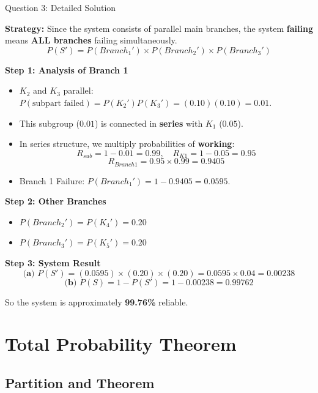 \documentclass[light]{lutbeamer}
\begin{document}
\begin{frame}[allowframebreaks]{Question 3: Detailed Solution}
    \small
    {\color{red}
    \textbf{Strategy:} Since the system consists of parallel main branches, the system \textbf{failing} means \textbf{ALL branches} failing simultaneously.
    \[ P(S') = P(Branch_1') \times P(Branch_2') \times P(Branch_3') \]

    \textbf{Step 1: Analysis of Branch 1}
    \begin{itemize}
        \item $K_2$ and $K_3$ parallel: $P(\text{subpart failed}) = P(K_2')P(K_3') = (0.10)(0.10) = 0.01$.
        \item This subgroup ($0.01$) is connected in \textbf{series} with $K_1$ ($0.05$).
        \item In series structure, we multiply probabilities of \textbf{working}:
        \[ R_{sub} = 1 - 0.01 = 0.99, \quad R_{K1} = 1 - 0.05 = 0.95 \]
        \[ R_{Branch1} = 0.95 \times 0.99 = 0.9405 \]
        \item Branch 1 Failure: $P(Branch_1') = 1 - 0.9405 = \mathbf{0.0595}$.
    \end{itemize}

    \textbf{Step 2: Other Branches}
    \begin{itemize}
        \item $P(Branch_2') = P(K_4') = \mathbf{0.20}$
        \item $P(Branch_3') = P(K_5') = \mathbf{0.20}$
    \end{itemize}

    \textbf{Step 3: System Result}
    \[
    \textbf{(a) } P(S') = (0.0595) \times (0.20) \times (0.20) = 0.0595 \times 0.04 = \mathbf{0.00238}
    \]
    \[
    \textbf{(b) } P(S) = 1 - P(S') = 1 - 0.00238 = \mathbf{0.99762}
    \]
    
    So the system is approximately \textbf{99.76\%} reliable.
    }
\end{frame}

\section{Total Probability Theorem}
\subsection{Partition and Theorem}
\end{document}
